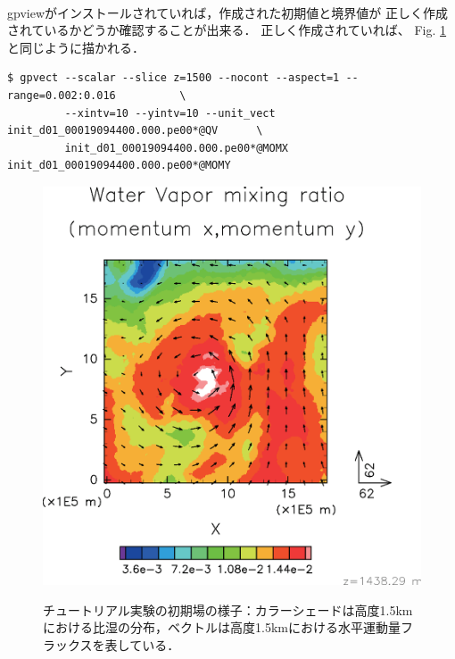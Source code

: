\vspace{1cm}
\\
gpviewがインストールされていれば，作成された初期値と境界値が
正しく作成されているかどうか確認することが出来る．
正しく作成されていれば、
Fig. \ref{fig:init}と同じように描かれる．

\begin{verbatim}
$ gpvect --scalar --slice z=1500 --nocont --aspect=1 --range=0.002:0.016          \
         --xintv=10 --yintv=10 --unit_vect init_d01_00019094400.000.pe00*@QV      \
         init_d01_00019094400.000.pe00*@MOMX init_d01_00019094400.000.pe00*@MOMY
\end{verbatim}


\begin{figure}[h]
\begin{center}
  \includegraphics[width=0.7\hsize]{./figure/init_qv-momxy.eps}\\
  \caption{チュートリアル実験の初期場の様子：カラーシェードは高度1.5kmにおける比湿の分布，ベクトルは高度1.5kmにおける水平運動量フラックスを表している．}
  \label{fig:init}
\end{center}
\end{figure}

